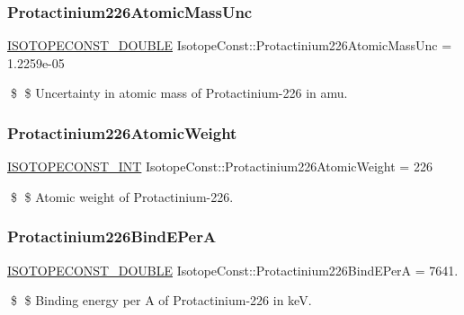 \subsubsection{\texorpdfstring{Protactinium226\+Atomic\+Mass\+Unc}{Protactinium226AtomicMassUnc}}
{\footnotesize\ttfamily \mbox{\hyperlink{group___isotope_const-_macros_ga8f45a7272ce02c0b4c65c44636ed719a}{I\+S\+O\+T\+O\+P\+E\+C\+O\+N\+S\+T\+\_\+\+D\+O\+U\+B\+LE}} Isotope\+Const\+::\+Protactinium226\+Atomic\+Mass\+Unc = 1.\+2259e-\/05}

\$ \$ Uncertainty in atomic mass of Protactinium-\/226 in amu. \mbox{\label{group___isotope_const-_protactinium-_pa226_ga9a590a7c280c78d8afb1c073b33f8dbb}} 
\subsubsection{\texorpdfstring{Protactinium226\+Atomic\+Weight}{Protactinium226AtomicWeight}}
{\footnotesize\ttfamily \mbox{\hyperlink{group___isotope_const-_macros_ga5f18360b3e99483a35c32d789e62621c}{I\+S\+O\+T\+O\+P\+E\+C\+O\+N\+S\+T\+\_\+\+I\+NT}} Isotope\+Const\+::\+Protactinium226\+Atomic\+Weight = 226}

\$ \$ Atomic weight of Protactinium-\/226. \mbox{\label{group___isotope_const-_protactinium-_pa226_ga20ccb3a4c87f5cf9b166576f2d52aa5b}} 
\subsubsection{\texorpdfstring{Protactinium226\+Bind\+E\+PerA}{Protactinium226BindEPerA}}
{\footnotesize\ttfamily \mbox{\hyperlink{group___isotope_const-_macros_ga8f45a7272ce02c0b4c65c44636ed719a}{I\+S\+O\+T\+O\+P\+E\+C\+O\+N\+S\+T\+\_\+\+D\+O\+U\+B\+LE}} Isotope\+Const\+::\+Protactinium226\+Bind\+E\+PerA = 7641.}

\$ \$ Binding energy per A of Protactinium-\/226 in keV. \mbox{\label{group___isotope_const-_protactinium-_pa226_gab4e92a85986c98a7e0f28de53a83ba0a}} 
